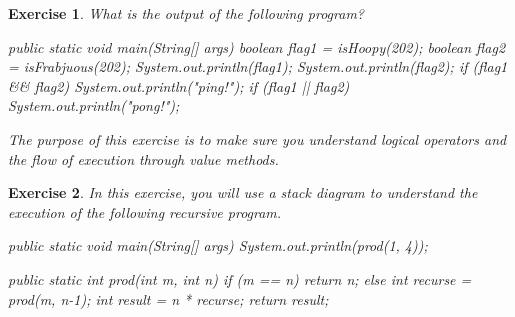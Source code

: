 \documentclass[12pt]{book}
\theoremstyle{exercise}
\newtheorem{exercise}{Exercise}[chapter]
\newcommand{\java}{\verb}%}
\begin{document}
\begin{exercise}

What is the output of the following program?

\begin{code}
public static void main(String[] args) {
    boolean flag1 = isHoopy(202);
    boolean flag2 = isFrabjuous(202);
    System.out.println(flag1);
    System.out.println(flag2);
    if (flag1 && flag2) {
        System.out.println("ping!");
    }
    if (flag1 || flag2) {
        System.out.println("pong!");
    }
}
\end{code}


The purpose of this exercise is to make sure you understand logical operators and the flow of execution through value methods.

\end{exercise}


\begin{exercise}

In this exercise, you will use a stack diagram to understand the execution of the following recursive program.

\begin{code}
public static void main(String[] args) {
    System.out.println(prod(1, 4));
}

public static int prod(int m, int n) {
    if (m == n) {
        return n;
    } else {
        int recurse = prod(m, n-1);
        int result = n * recurse;
        return result;
    }
}
\end{code}


\end{exercise}
\end{document}
